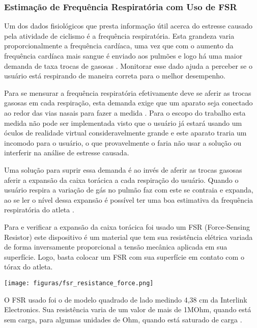 \subsubsection{Estimação de Frequência Respiratória com Uso de FSR}

	Um dos dados fisiológicos que presta informação útil acerca do estresse causado pela atividade de ciclismo é a frequência respiratória. Esta grandeza varia proporcionalmente a frequência cardíaca, uma vez que com o aumento da frequência cardíaca mais sangue é enviado aos pulmões e logo há uma maior demanda de taxa trocas de gasosas \cite{rosero}.  Monitorar esse dado ajuda a perceber se o usuário está respirando de maneira correta para o melhor desempenho.

	Para se mensurar a frequência respiratória efetivamente deve se aferir as trocas gasosas em cada respiração, esta demanda exige que um aparato seja conectado ao redor das vias nasais para fazer a medida \cite{miranda2015}. Para o escopo do trabalho esta medida não pode ser implementada visto que o usuário já estará usando um óculos de realidade virtual consideravelmente grande e este aparato traria um incomodo para o usuário, o que provavelmente o faria não usar a solução ou interferir na análise de estresse causada.

	Uma solução para suprir essa demanda é ao invés de aferir as trocas gasosas aferir a expansão da caixa torácica a cada respiração do usuário. Quando o usuário respira a variação de gás no pulmão faz com este se contraia e expanda, ao se ler o nível dessa expansão é possível ter uma boa estimativa da frequência respiratória do atleta \cite{miranda2015}.

	Para e verificar a expansão da caixa torácica foi usado um FSR (Force-Sensing Resistor) este dispositivo é um material que tem sua resistência elétrica variada de forma inversamente proporcional a tensão mecânica aplicada em sua superfície. Logo, basta colocar um FSR com sua superfície em contato com o tórax do atleta.

    \begin{center}
    	\texttt{[image: figuras/fsr\_resistance\_force.png]}
        \label{fsr_curve}
    \end{center}

	O FSR usado foi o de modelo quadrado de lado medindo 4,38 cm da Interlink Electronics. Sua resistência varia de um valor de mais de 1MOhm, quando está sem carga, para algumas unidades de Ohm, quando está saturado de carga \cite{fsr_guide}.


